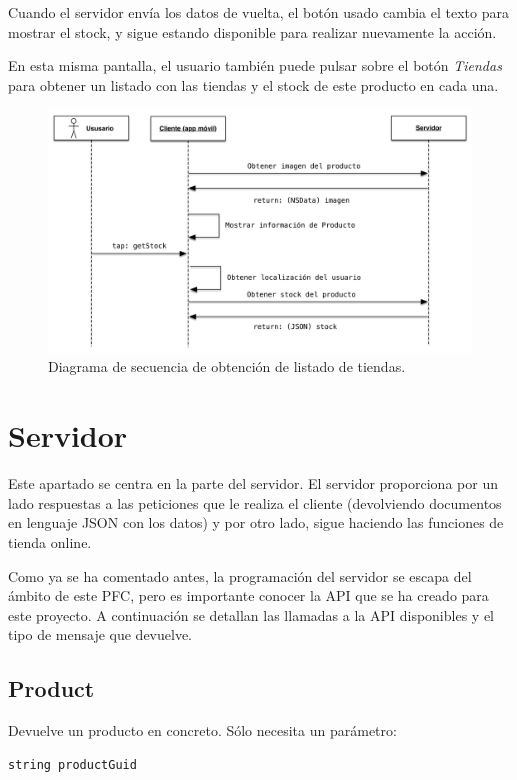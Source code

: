 Cuando el servidor envía los datos de vuelta, el botón usado cambia el texto para mostrar el stock, y sigue estando disponible para realizar nuevamente la acción.

En esta misma pantalla, el usuario también puede pulsar sobre el botón \emph{Tiendas} para obtener un listado con las tiendas y el stock de este producto en cada una.

\begin{figure}[H]
	\centering
		\includegraphics[width=1\textwidth]{./img/diagrama-get-stock.png}
	\caption{Diagrama de secuencia de obtención de listado de tiendas.}
	\label{fig:diagrama-tiendas}
\end{figure}

\section{Servidor}
Este apartado se centra en la parte del servidor. El servidor proporciona por un lado respuestas a las peticiones que le realiza el cliente (devolviendo documentos en lenguaje JSON con los datos) y por otro lado, sigue haciendo las funciones de tienda online.

Como ya se ha comentado antes, la programación del servidor se escapa del ámbito de este PFC, pero es importante conocer la API que se ha creado para este proyecto. A continuación se detallan las llamadas a la API disponibles y el tipo de mensaje que devuelve.

\subsection{Product}
Devuelve un producto en concreto. Sólo necesita un parámetro:

\begin{lstlisting}[language=csh]
	string productGuid
\end{lstlisting}

